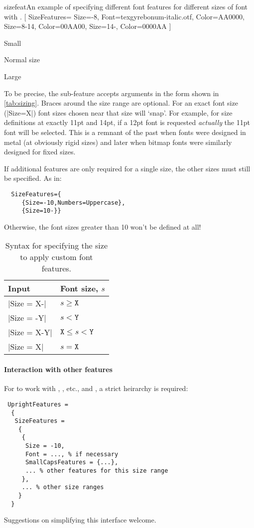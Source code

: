 \begin{Xexample}{sizefeat}{An example of specifying different font features for different sizes of font with .}
  [
    SizeFeatures={
      {Size={-8}, Font=texgyrebonum-italic.otf, Color=AA0000},
      {Size={8-14}, Color=00AA00},
      {Size={14-}, Color=0000AA}} ]

  {\scriptsize Small\par} Normal size\par {\Large Large\par}
\end{Xexample}

To be precise, the  sub-feature accepts arguments in the form shown in \vref{tab:sizing}.
Braces around the size range are optional. For an exact font size (|Size=X|)
font sizes chosen near that size will `snap'. For example, for size definitions
at exactly 11pt and 14pt, if a 12pt font is requested \emph{actually} the
11pt font will be selected. This is a remnant of the past when fonts were designed
in metal (at obviously rigid sizes) and later when bitmap fonts were similarly
designed for fixed sizes.

If additional features are only required for a single size, the other sizes
must still be specified.  As in:
\begin{Verbatim}
  SizeFeatures={
     {Size=-10,Numbers=Uppercase},
     {Size=10-}}
\end{Verbatim}
Otherwise, the font sizes greater than 10 won't be defined at all!

\begin{table}
\caption{Syntax for specifying the size to apply custom font features.}\label{tab:sizing}
\centering
\begin{tabular}{@{}ll@{}}
\toprule
Input & Font size, $s$ \\
\midrule
 |Size = X-| & $s \geq \texttt{X}$ \\
 |Size = -Y| & $s < \texttt{Y}$ \\
 |Size = X-Y| & $\texttt{X} \leq s < \texttt{Y}$ \\
 |Size = X| & $s = \texttt{X}$ \\
\bottomrule
\end{tabular}
\end{table}

\paragraph{Interaction with other features}
For  to work with , , etc., and , a strict heirarchy is required:
\begin{Verbatim}
 UprightFeatures =
  {
   SizeFeatures =
    {
     {
      Size = -10,
      Font = ..., % if necessary
      SmallCapsFeatures = {...},
      ... % other features for this size range
     },
     ... % other size ranges
    }
  }
\end{Verbatim}
Suggestions on simplifying this interface welcome.


